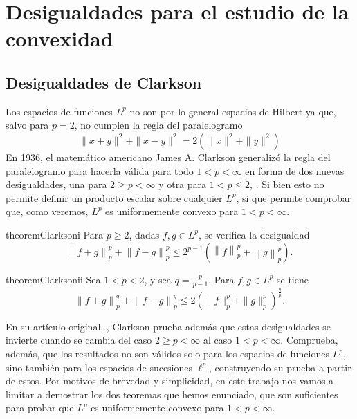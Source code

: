 \section{Desigualdades para el estudio de la convexidad}

\subsection{Desigualdades de Clarkson}

Los espacios de funciones $ L^p $ no son por lo general espacios de Hilbert ya que, salvo para $ p = 2 $, no cumplen la regla del paralelogramo
\begin{equation}
    \| x + y \|^2 + \| x - y \|^2 = 2 \left( \| x \|^2 + \| y\|^2 \right)
\end{equation}
En 1936, el matemático americano James A. Clarkson generalizó la regla del paralelogramo para hacerla válida para todo $ 1 < p < \infty $ en forma de dos nuevas desigualdades, una para $ 2 \geq p < \infty $ y otra para $ 1 < p \leq 2 $, \cite{clarkson}. Si bien esto no permite definir un producto escalar sobre cualquier $ L^p $, si que permite comprobar que, como veremos, $ L^p $ es uniformemente convexo para $ 1 < p < \infty $.

\begin{restatable}{theorem}{Clarksoni} \label{thm:clarkson-1}
    Para $ p \geq 2 $, dadas $ f, g \in L^p $, se verifica la desigualdad
    \begin{equation} \label{eq:clarkson-1}
        \left\| f+g \right\|_p^p + \left\| f-g \right\|_p^p \leq 2^{p-1} \left( \left\|f\right\|_p^p + \left\|g\right\|_p^p \right).
    \end{equation}
\end{restatable}

\begin{restatable}{theorem}{Clarksonii} \label{thm:clarkson-2}
    Sea $ 1 < p < 2 $, y sea $ q = \frac{p}{p-1}$. Para $ f, g \in L^p $ se tiene
    \begin{equation} \label{eq:clarkson-2}
        \left\| f + g \right\|_p^q + \left\| f - g \right\|_p^q \leq 2 \left(\|f \|_p^p + \|g\|_p^p \right)^{\frac{q}{p}}.
    \end{equation}
\end{restatable}

En su artículo original, \cite{clarkson}, Clarkson prueba además que estas desigualdades se invierte cuando se cambia del caso $ 2 \geq p < \infty $ al caso $ 1 < p < \infty $. Comprueba, además, que los resultados no son válidos solo para los espacios de funciones $ L^p $, sino también para los espacios de sucesiones $ \ell^p $, construyendo su prueba a partir de estos. Por motivos de brevedad y simplicidad, en este trabajo nos vamos a limitar a demostrar los dos teoremas que hemos enunciado, que son suficientes para probar que $ L^p $ es uniformemente convexo para $ 1 < p < \infty $.

